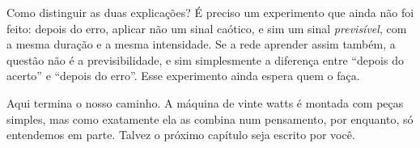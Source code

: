 Como distinguir as duas explicações? É preciso um experimento que ainda não foi feito: depois do erro, aplicar não um sinal caótico, e sim um sinal \emph{previsível}, com a mesma duração e a mesma intensidade. Se a rede aprender assim também, a questão não é a previsibilidade, e sim simplesmente a diferença entre ``depois do acerto'' e ``depois do erro''. Esse experimento ainda espera quem o faça.

Aqui termina o nosso caminho. A máquina de vinte watts é montada com peças simples, mas como exatamente ela as combina num pensamento, por enquanto, só entendemos em parte. Talvez o próximo capítulo seja escrito por você.

